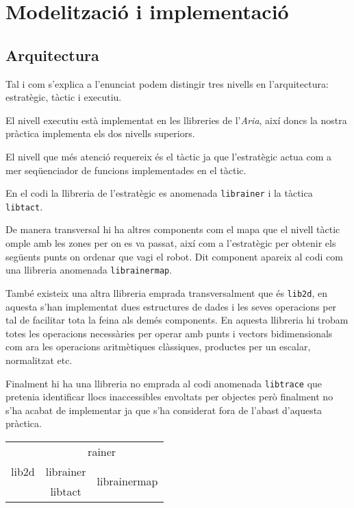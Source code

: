 \section{Modelització i implementació}

\subsection{Arquitectura}
Tal i com s'explica a l'enunciat podem distingir tres nivells en l'arquitectura: estratègic, tàctic i executiu.

El nivell executiu està implementat en les llibreries de l'\emph{Aria}, així doncs la nostra pràctica implementa
els dos nivells superiors.

El nivell que més atenció requereix és el tàctic ja que l'estratègic actua com a mer seqüenciador
de funcions implementades en el tàctic.

En el codi la llibreria de l'estratègic es anomenada \texttt{librainer} i la tàctica \texttt{libtact}.

De manera transversal hi ha altres components com el mapa que el nivell tàctic omple amb les zones
per on es va passat, així com a l'estratègic per obtenir els següents punts on ordenar que vagi el robot.
Dit component apareix al codi com una llibreria anomenada \texttt{librainermap}.

També existeix una altra llibreria emprada transversalment que és \texttt{lib2d}, en aquesta s'han implementat
dues estructures de dades i les seves operacions per tal de facilitar tota la feina als demés components.
En aquesta llibreria hi trobam totes les operacions necessàries per operar amb punts i vectors bidimensionals
com ara les operacions aritmètiques clàssiques, productes per un escalar, normalitzat etc.

Finalment hi ha una llibreria no emprada al codi anomenada \texttt{libtrace} que pretenia identificar llocs
inaccessibles envoltats per objectes però finalment no s'ha acabat de implementar ja que s'ha considerat
fora de l'abast d'aquesta pràctica.


\begin{center}
  \begin{tabular}{|c|c|c|}
    \hline
    \multirow{3}{*}{lib2d} & \multicolumn{2}{|c|}{rainer}  \\
    \cline{2-3}\cline{3-3}
			  & librainer & \multirow{2}{*}{librainermap}\\
    \cline{2-2}
			  & libtact & \\
    \hline
  \end{tabular}
\end{center}


